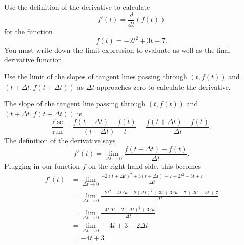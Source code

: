 \documentclass{ximera}
\author{Emma Smith Zbarsky}
\begin{document}
\begin{exercise}

Use the definition of the derivative to calculate
\[f'(t) = \frac{d}{dt}(f(t))\] for the function \[f(t) = -2t^2+3t-7.\]
You must write down the limit expression to evaluate as well as the
final derivative function.


\begin{hint}
Use the limit of the slopes of tangent lines passing through $(t,f(t))$
and $(t+\Delta t,f(t+\Delta t))$ as $\Delta t$ approaches zero to
calculate the derivative.
\end{hint}


\begin{hint}
The slope of the tangent line passing through $(t,f(t))$ and
$(t+\Delta t, f(t+\Delta t))$ is
\[\frac{\mbox{rise}}{\mbox{run}} = \frac{f(t+\Delta t) - f(t)}{(t+\Delta t)-t} = \frac{f(t+\Delta t)-f(t)}{\Delta t}.\]
The definition of the derivative says
\[f'(t) = \lim_{\Delta t \to 0} \frac{f(t+\Delta t)-f(t)}{\Delta t}.\]
Plugging in our function $f$ on the right hand side, this becomes
\begin{align*} f'(t) &= \lim_{\Delta t \to 0} \frac{-2(t+\Delta t)^2+3(t+\Delta t)-7+2t^2-3t+7}{\Delta t} \\
&= \lim_{\Delta t \to 0} \frac{-2t^2-4t\Delta t-2(\Delta t)^2+3t+3\Delta t-7+2t^2-3t+7}{\Delta t} \\
&= \lim_{\Delta t \to 0} \frac{-4t\Delta t-2(\Delta t)^2+3\Delta t}{\Delta t} \\
&= \lim_{\Delta t \to 0} -4t+3 -2\Delta t \\
&= \boxed{-4t+3}
\end{align*}
\end{hint}



\end{exercise}
\end{document}
